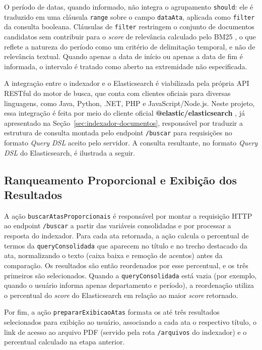 O período de datas, quando informado, não integra o agrupamento \texttt{should}: ele é traduzido em uma cláusula \texttt{range} sobre o campo \texttt{dataAta}, aplicada como \texttt{filter} da consulta booleana. Cláusulas de \texttt{filter} restringem o conjunto de documentos candidatos sem contribuir para o \textit{score} de relevância calculado pelo BM25 \cite{IBMElasticsearch}, o que reflete a natureza do período como um critério de delimitação temporal, e não de relevância textual. Quando apenas a data de início ou apenas a data de fim é informada, o intervalo é tratado como aberto na extremidade não especificada.

A integração entre o indexador e o Elasticsearch é viabilizada pela própria API RESTful do motor de busca, que conta com clientes oficiais para diversas linguagens, como Java, Python, .NET, PHP e JavaScript/Node.js. Neste projeto, essa integração é feita por meio do cliente oficial \textbf{@elastic/elasticsearch} \cite{elasticsearch-js}, já apresentado na Seção~\ref{sec:indexador-documentos}, responsável por traduzir a estrutura de consulta montada pelo endpoint \texttt{/buscar} para requisições no formato \textit{Query DSL} aceito pelo servidor. A consulta resultante, no formato \textit{Query DSL} do Elasticsearch, é ilustrada a seguir.

\subsection{Ranqueamento Proporcional e Exibição dos Resultados}\label{subsec:busca-proporcional}

A ação \texttt{buscarAtasProporcionais} é responsável por montar a requisição HTTP ao endpoint \texttt{/buscar} a partir das variáveis consolidadas e por processar a resposta do indexador. Para cada ata retornada, a ação calcula o percentual de termos da \texttt{queryConsolidada} que aparecem no título e no trecho destacado da ata, normalizando o texto (caixa baixa e remoção de acentos) antes da comparação. Os resultados são então reordenados por esse percentual, e os três primeiros são selecionados. Quando a \texttt{queryConsolidada} está vazia (por exemplo, quando o usuário informa apenas departamento e período), a reordenação utiliza o percentual do \textit{score} do Elasticsearch em relação ao maior \textit{score} retornado.

Por fim, a ação \texttt{prepararExibicaoAtas} formata os até três resultados selecionados para exibição ao usuário, associando a cada ata o respectivo título, o link de acesso ao arquivo PDF (servido pela rota \texttt{/arquivos} do indexador) e o percentual calculado na etapa anterior.

